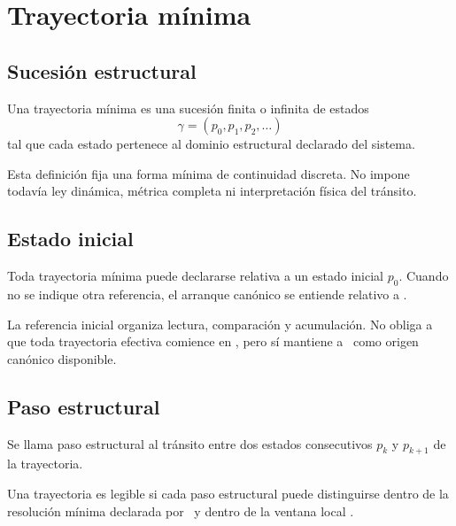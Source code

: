 \chapter{Trayectoria mínima}

\section{Sucesión estructural}
\begin{definition}
Una trayectoria mínima es una sucesión finita o infinita de estados
\[
\gamma = (p_0,p_1,p_2,\dots)
\]
tal que cada estado pertenece al dominio estructural declarado del sistema.
\end{definition}

\begin{observation}
Esta definición fija una forma mínima de continuidad discreta. No impone todavía ley dinámica, métrica completa ni interpretación física del tránsito.
\end{observation}

\section{Estado inicial}
\begin{definition}
Toda trayectoria mínima puede declararse relativa a un estado inicial \(p_0\). Cuando no se indique otra referencia, el arranque canónico se entiende relativo a \subz.
\end{definition}

\begin{observation}
La referencia inicial organiza lectura, comparación y acumulación. No obliga a que toda trayectoria efectiva comience en \subz, pero sí mantiene a \subz\ como origen canónico disponible.
\end{observation}

\section{Paso estructural}
\begin{definition}
Se llama paso estructural al tránsito entre dos estados consecutivos \(p_k\) y \(p_{k+1}\) de la trayectoria.
\end{definition}

\begin{definition}
Una trayectoria es legible si cada paso estructural puede distinguirse dentro de la resolución mínima declarada por \eps\ y dentro de la ventana local \Win.
\end{definition}

